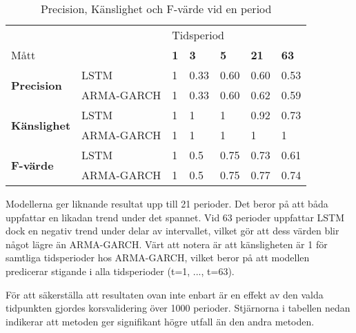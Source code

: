 \documentclass[12pt]{article}
\begin{document}
\begin{table}[H]
\caption{Precision, Känslighet och F-värde vid en period}
\begin{tabular}{||lllllll||}
\hline
                                     &            & \multicolumn{5}{l||}{Tidsperiod}                                  \\
Mått                                 &            & \textbf{1} & \textbf{3} & \textbf{5} & \textbf{21} & \textbf{63} \\ \hline\hline
\multirow{2}{*}{\textbf{Precision}} & LSTM       & 1          & 0.33       & 0.60       & 0.60        & 0.53        \\
                                     & ARMA-GARCH & 1          & 0.33       & 0.60       & 0.62        & 0.59        \\ \cline{2-7} 
\multirow{2}{*}{\textbf{Känslighet}}  & LSTM       & 1          & 1          & 1          & 0.92           & 0.73       \\
                                     & ARMA-GARCH & 1          & 1          & 1          & 1           & 1           \\ \cline{2-7} 
\multirow{2}{*}{\textbf{F-värde}}    & LSTM       & 1          & 0.5        & 0.75       & 0.73       & 0.61       \\
                                     & ARMA-GARCH & 1          & 0.5        & 0.75       & 0.77       & 0.74        \\ \hline
\end{tabular}
\end{table}
Modellerna ger liknande resultat upp till 21 perioder. Det beror på att båda uppfattar en likadan trend under det spannet. Vid 63 perioder uppfattar LSTM dock en negativ trend under delar av intervallet, vilket gör att dess värden blir något lägre än ARMA-GARCH. Värt att notera är att känsligheten är 1 för samtliga tidsperioder hos ARMA-GARCH, vilket beror på att modellen predicerar stigande i alla tidsperioder (t=1, ..., t=63).

För att säkerställa att resultaten ovan inte enbart är en effekt av den valda tidpunkten gjordes korsvalidering över 1000 perioder. Stjärnorna i tabellen nedan indikerar att metoden ger signifikant högre utfall än den andra metoden.
\end{document}
